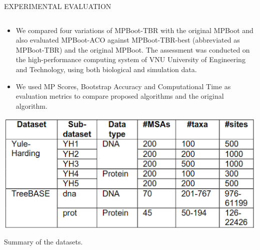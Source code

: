 \documentclass[%
  final,%
  english,%
]{beamer}
\begin{document}
\begin{frame}[t, fragile = singleslide]
\begin{columns}[t, onlytextwidth]
\begin{column}{\textwidth}
\begin{block}{EXPERIMENTAL EVALUATION}
\begin{columns}
\begin{column}{0.48\textwidth}
\begin{itemize}
\item We compared four variations of MPBoot-TBR with the original MPBoot and also evaluated MPBoot-ACO against MPBoot-TBR-best (abbreviated as MPBoot-TBR) and the original MPBoot. The assessment was conducted on the high-performance computing system of VNU University of Engineering and Technology, using both biological and simulation data.
    \item We used MP Scores, Bootstrap Accuracy and Computational Time as evaluation metrics to compare proposed algorithms and the original algorithm.
\end{itemize}
\vspace{0.05cm}
\begin{table}
\centering%
\includegraphics[width = 0.65\columnwidth]{./Figuras/datasets.png}
\caption{Summary of the datasets.}
\end{table}


\end{column}
\end{columns}
\end{block}
\end{column}
\end{columns}
\end{frame}
\end{document}

